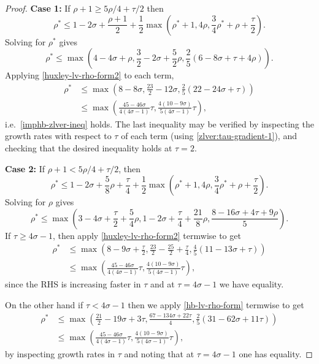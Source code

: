 \documentclass[a4paper, 10pt]{amsart}
\begin{document}
\begin{proof}
\textbf{Case 1:} If $\rho + 1 \ge 5\rho/4 + \tau/2$ then
\[
\rho^* \le 1 -2\sigma + \frac{\rho + 1}{2} + \frac{1}{2}\max\left(\rho^* + 1, 4\rho, \frac{3}{4}\rho^*+\rho +\frac{\tau}{2}\right).
\]
Solving for $\rho^*$ gives
\[
\rho^* \le \max\left(4 - 4\sigma + \rho, \frac{3}{2} - 2\sigma + \frac{5}{2}\rho, \frac{2}{5}(6 - 8\sigma + \tau + 4\rho)\right).
\]
Applying \eqref{huxley-lv-rho-form2} to each term,
\begin{align*}
\rho^* &\le \max\left(8 - 8\sigma, \frac{23}{2} - 12\sigma, \frac{2}{5}(22 - 24\sigma + \tau)\right) \\
&\le \max\left(\frac{45 - 46\sigma}{4(4\sigma - 1)}\tau, \frac{4(10 - 9\sigma)}{5(4\sigma - 1)}\tau\right),
\end{align*}
i.e.\ \eqref{imphb-zlver-ineq} holds. The last inequality may be verified by inspecting the growth rates with respect to $\tau$ of each term (using \eqref{zlver:tau-gradient-1}), and checking that the desired inequality holds at $\tau = 2$.

\textbf{Case 2:} If $\rho + 1 < 5\rho/4 + \tau/2$, then
\[
\rho^* \le 1 - 2\sigma + \frac{5}{8}\rho + \frac{\tau}{4} + \frac{1}{2}\max\left(\rho^* + 1, 4\rho, \frac{3}{4}\rho^*+\rho +\frac{\tau}{2}\right).
\]
Solving for $\rho$ gives
\[
\rho^* \le \max\left(3 - 4\sigma + \frac{\tau}{2} + \frac{5}{4}\rho, 1 - 2\sigma + \frac{\tau}{4} + \frac{21}{8}\rho, \frac{8 - 16\sigma + 4\tau + 9\rho}{5}\right).
\]
If $\tau \ge 4\sigma - 1$, then apply \eqref{huxley-lv-rho-form2} termwise to get
\begin{align*}
\rho^* &\le \max\left(8 - 9\sigma + \frac{\tau}{2}, \frac{23}{2} - \frac{25}{2} + \frac{\tau}{4}, \frac{4}{5}(11 - 13 \sigma + \tau)\right)\\
&\le \max\left(\frac{45 - 46\sigma}{4(4\sigma - 1)}\tau, \frac{4(10 - 9\sigma)}{5(4\sigma - 1)}\tau\right),
\end{align*}
since the RHS is increasing faster in $\tau$ and at $\tau = 4\sigma - 1$ we have equality.

On the other hand if $\tau < 4\sigma - 1$ then we apply \eqref{hb-lv-rho-form} termwise to get
\begin{align*}
    \rho^* &\le \max\left(\frac{21}{2} - 19\sigma + 3\tau, \frac{67 -134\sigma + 22\tau}{4}, \frac{2}{5}(31 - 62\sigma + 11\tau)\right)\\
    &\le \max\left(\frac{45 - 46\sigma}{4(4\sigma - 1)}\tau, \frac{4(10 - 9\sigma)}{5(4\sigma - 1)}\tau\right),
\end{align*}
by inspecting growth rates in $\tau$ and noting that at $\tau = 4\sigma - 1$ one has equality. 


\end{proof}
\end{document}
